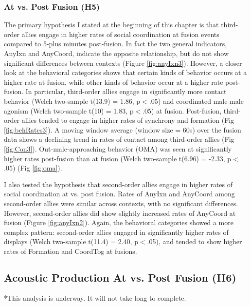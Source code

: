 \documentclass[11pt]{amsart}
\begin{document}
\subsubsection{At vs. Post Fusion (H5)}
The primary hypothesis I stated at the beginning of this chapter is that third-order allies engage in higher rates of social coordination at fusion events compared to 5-plus minutes post-fusion. In fact the two general indicators, AnyIxn and AnyCoord, indicate the opposite relationship, but do not show significant differences between contexts (Figure \ref{fig:anyIxn3}). However, a closer look at the behavioral categories shows that certain kinds of behavior occurs at a higher rate at fusion, while other kinds of behavior occur at a higher rate post-fusion. In particular, third-order allies engage in significantly more contact behavior (Welch two-sample t(13.9) =  1.86, p$<$.05) and coordinated male-male agonism (Welch two-sample t(10) =  1.83, p$<$.05) at fusion. Post-fusion, third-order allies tended to engage in higher rates of synchrony and formation (Fig \ref{fig:behRates3}). 
A moving window average (window size = 60s) over the fusion data shows a declining trend in rates of contact among third-order allies (Fig \ref{fig:Con3}).
Out-male-approaching behavior (OMA) was seen at significantly higher rates post-fusion than at fusion (Welch two-sample t(6.96) =  -2.33, p$<$.05) (Fig \ref{fig:oma}). 

I also tested the hypothesis that second-order allies engage in higher rates of social coordination at vs. post fusion. Rates of AnyIxn and AnyCoord among second-order allies were similar across contexts, with no significant differences. However, second-order allies did show slightly increased rates of AnyCoord at fusion (Figure \ref{fig:anyIxn2}). Again, the behavioral categories showed a more complex pattern: second-order allies engaged in significantly higher rates of displays (Welch two-sample t(11.4) =  2.40, p$<$.05), and tended to show higher rates of Formation and CoordTog at fusions.


\subsection{Acoustic Production At vs. Post Fusion (H6)}

*This analysis is underway. It will not take long to complete.
\end{document}
